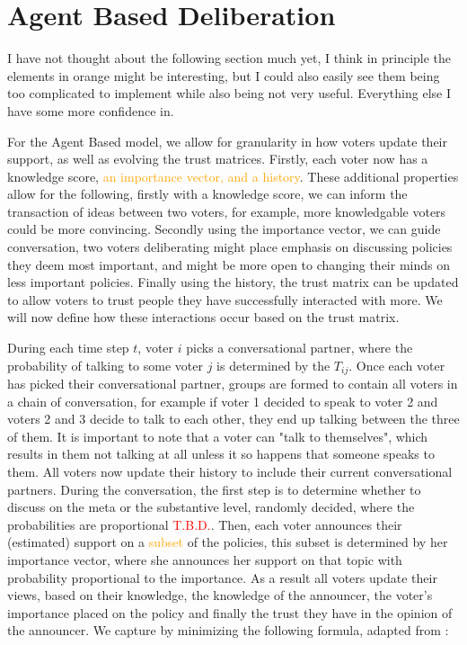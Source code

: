 \section{Agent Based Deliberation}
\textcolor{RedViolet}{I have not thought about the following section much yet, I think in principle the elements in orange might be interesting, but I could also easily see them being too complicated to implement while also being not very useful. Everything else I have some more confidence in.}

For the Agent Based model, we allow for granularity in how voters update their support, as well as evolving the trust matrices. Firstly, each voter now has a knowledge score, \textcolor{orange}{an importance vector, and a history}. These additional properties allow for the following, firstly with a knowledge score, we can inform the transaction of ideas between two voters, for example, more knowledgable voters could be more convincing. Secondly using the importance vector, we can guide conversation, two voters deliberating might place emphasis on discussing policies they deem most important, and might be more open to changing their minds on less important policies. Finally using the history, the trust matrix can be updated to allow voters to trust people they have successfully interacted with more. We will now define how these interactions occur based on the trust matrix.


During each time step $t$, voter $i$ picks a conversational partner, where the probability of talking to some voter $j$ is determined by the $T_{ij}$. Once each voter has picked their conversational partner, groups are formed to contain all voters in a chain of conversation, for example if voter 1 decided to speak to voter 2 and voters 2 and 3 decide to talk to each other, they end up talking between the three of them. It is important to note that a voter can "talk to themselves", which results in them not talking at all unless it so happens that someone speaks to them. All voters now update their history to include their current conversational partners. During the conversation, the first step is to determine whether to discuss on the meta or the substantive level, randomly decided, where the probabilities are proportional \textcolor{red}{T.B.D.}.
Then, each voter announces their (estimated) support on a \textcolor{orange}{subset} of the policies, this subset is determined by her importance vector, where she announces her support on that topic with probability proportional to the importance. As a result all voters update their views, based on their knowledge, the knowledge of the announcer, the voter's importance placed on the policy and finally the trust they have in the opinion of the announcer. We capture by minimizing the following formula, adapted from \citet{radDeliberationSinglePeakednessCoherent2021}:

